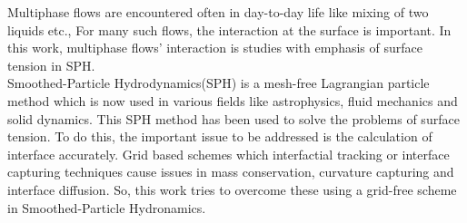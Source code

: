 \begin{Abstract}

Multiphase flows are encountered often in day-to-day life like mixing of two liquids etc., For many such flows, the interaction at the surface is important. In this work, multiphase flows' interaction is studies with emphasis of surface tension in SPH.\\

Smoothed-Particle Hydrodynamics(SPH) is a mesh-free Lagrangian particle method which is now used in various fields like astrophysics, fluid mechanics and solid dynamics. This SPH method has been used to solve the problems of surface tension. To do this, the important issue to be addressed is the calculation of interface accurately. Grid based schemes which interfactial tracking or interface capturing techniques cause issues in mass conservation, curvature capturing and interface diffusion. So, this work tries to overcome these using a grid-free scheme in Smoothed-Particle Hydronamics.

%
%
%
%
%
\end{Abstract}

